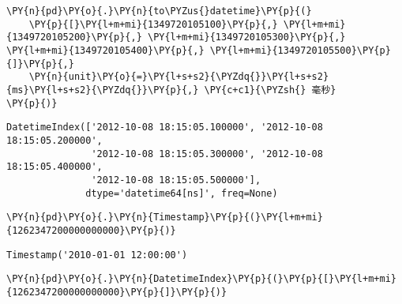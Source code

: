     \begin{tcolorbox}[breakable, size=fbox, boxrule=1pt, pad at break*=1mm,colback=cellbackground, colframe=cellborder]
\begin{Verbatim}[commandchars=\\\{\}]
\PY{n}{pd}\PY{o}{.}\PY{n}{to\PYZus{}datetime}\PY{p}{(}
    \PY{p}{[}\PY{l+m+mi}{1349720105100}\PY{p}{,} \PY{l+m+mi}{1349720105200}\PY{p}{,} \PY{l+m+mi}{1349720105300}\PY{p}{,} \PY{l+m+mi}{1349720105400}\PY{p}{,} \PY{l+m+mi}{1349720105500}\PY{p}{]}\PY{p}{,}
    \PY{n}{unit}\PY{o}{=}\PY{l+s+s2}{\PYZdq{}}\PY{l+s+s2}{ms}\PY{l+s+s2}{\PYZdq{}}\PY{p}{,} \PY{c+c1}{\PYZsh{} 毫秒}
\PY{p}{)}
\end{Verbatim}
\end{tcolorbox}

            \begin{tcolorbox}[breakable, size=fbox, boxrule=.5pt, pad at break*=1mm, opacityfill=0]
\begin{Verbatim}[commandchars=\\\{\}]
DatetimeIndex(['2012-10-08 18:15:05.100000', '2012-10-08 18:15:05.200000',
               '2012-10-08 18:15:05.300000', '2012-10-08 18:15:05.400000',
               '2012-10-08 18:15:05.500000'],
              dtype='datetime64[ns]', freq=None)
\end{Verbatim}
\end{tcolorbox}
        
    \begin{tcolorbox}[breakable, size=fbox, boxrule=1pt, pad at break*=1mm,colback=cellbackground, colframe=cellborder]
\begin{Verbatim}[commandchars=\\\{\}]
\PY{n}{pd}\PY{o}{.}\PY{n}{Timestamp}\PY{p}{(}\PY{l+m+mi}{1262347200000000000}\PY{p}{)}
\end{Verbatim}
\end{tcolorbox}

            \begin{tcolorbox}[breakable, size=fbox, boxrule=.5pt, pad at break*=1mm, opacityfill=0]
\begin{Verbatim}[commandchars=\\\{\}]
Timestamp('2010-01-01 12:00:00')
\end{Verbatim}
\end{tcolorbox}
        
    \begin{tcolorbox}[breakable, size=fbox, boxrule=1pt, pad at break*=1mm,colback=cellbackground, colframe=cellborder]
\begin{Verbatim}[commandchars=\\\{\}]
\PY{n}{pd}\PY{o}{.}\PY{n}{DatetimeIndex}\PY{p}{(}\PY{p}{[}\PY{l+m+mi}{1262347200000000000}\PY{p}{]}\PY{p}{)}
\end{Verbatim}
\end{tcolorbox}

